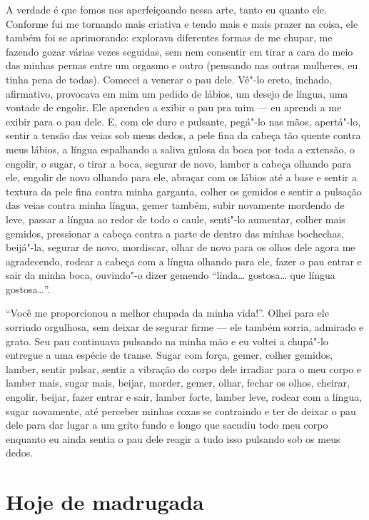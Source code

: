 A verdade é que fomos nos aperfeiçoando nessa arte, tanto eu quanto ele.
Conforme fui me tornando mais criativa e tendo mais e mais prazer na
coisa, ele também foi se aprimorando: explorava diferentes formas de me
chupar, me fazendo gozar várias vezes seguidas, sem nem consentir em
tirar a cara do meio das minhas pernas entre um orgasmo e outro
(pensando nas outras mulheres, eu tinha pena de todas). Comecei a
venerar o pau dele. Vê"-lo ereto, inchado, afirmativo, provocava em mim
um pedido de lábios, um desejo de língua, uma vontade de engolir. Ele
aprendeu a exibir o pau pra mim --- eu aprendi a me exibir para o pau
dele. E, com ele duro e pulsante, pegá"-lo nas mãos, apertá"-lo, sentir a
tensão das veias sob meus dedos, a pele fina da cabeça tão quente contra
meus lábios, a língua espalhando a saliva gulosa da boca por toda a extensão,
o engolir, o sugar, o tirar a boca, segurar de novo, lamber a cabeça olhando
para ele, engolir de novo olhando para ele, abraçar com os lábios até a base
e sentir a textura da pele fina contra minha garganta, colher os gemidos
e sentir a pulsação das veias contra minha língua, gemer também, subir
novamente mordendo de leve, passar a língua ao redor de todo o caule, senti"-lo
aumentar, colher mais gemidos, pressionar a cabeça contra a parte de dentro das
minhas bochechas, beijá"-la, segurar de novo, mordiscar, olhar de novo
para os olhos dele agora me agradecendo, rodear a cabeça com a língua
olhando para ele, fazer o pau entrar e sair da minha boca, ouvindo"-o
dizer gemendo ``linda… gostosa… que língua
gostosa…''.

``Você me proporcionou a melhor chupada da minha vida!''. Olhei para ele
sorrindo orgulhosa, sem deixar de segurar firme --- ele também sorria,
admirado e grato. Seu pau continuava pulsando na minha mão e eu voltei a
chupá"-lo entregue a uma espécie de transe. Sugar com força, gemer,
colher gemidos, lamber, sentir pulsar, sentir a vibração do corpo dele
irradiar para o meu corpo e lamber mais, sugar mais, beijar, morder,
gemer, olhar, fechar os olhos, cheirar, engolir, beijar, fazer entrar e
sair, lamber forte, lamber leve, rodear com a língua, sugar novamente,
até perceber minhas coxas se contraindo e ter de deixar o pau dele para
dar lugar a um grito fundo e longo que sacudiu todo meu corpo enquanto
eu ainda sentia o pau dele reagir a tudo isso pulsando sob os meus dedos.

\chapter{Hoje de madrugada}

